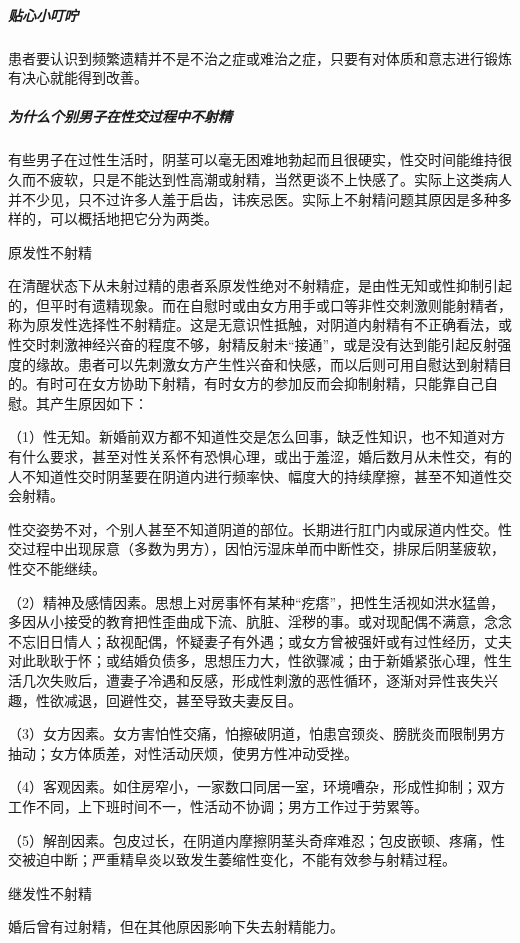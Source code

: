 \subparagraph{贴心小叮咛}

患者要认识到频繁遗精并不是不治之症或难治之症，只要有对体质和意志进行锻炼有决心就能得到改善。

\subparagraph{为什么个别男子在性交过程中不射精}

有些男子在过性生活时，阴茎可以毫无困难地勃起而且很硬实，性交时间能维持很久而不疲软，只是不能达到性高潮或射精，当然更谈不上快感了。实际上这类病人并不少见，只不过许多人羞于启齿，讳疾忌医。实际上不射精问题其原因是多种多样的，可以概括地把它分为两类。

原发性不射精

在清醒状态下从未射过精的患者系原发性绝对不射精症，是由性无知或性抑制引起的，但平时有遗精现象。而在自慰时或由女方用手或口等非性交刺激则能射精者，称为原发性选择性不射精症。这是无意识性抵触，对阴道内射精有不正确看法，或性交时刺激神经兴奋的程度不够，射精反射未“接通”，或是没有达到能引起反射强度的缘故。患者可以先刺激女方产生性兴奋和快感，而以后则可用自慰达到射精目的。有时可在女方协助下射精，有时女方的参加反而会抑制射精，只能靠自己自慰。其产生原因如下：

（1）性无知。新婚前双方都不知道性交是怎么回事，缺乏性知识，也不知道对方有什么要求，甚至对性关系怀有恐惧心理，或出于羞涩，婚后数月从未性交，有的人不知道性交时阴茎要在阴道内进行频率快、幅度大的持续摩擦，甚至不知道性交会射精。

性交姿势不对，个别人甚至不知道阴道的部位。长期进行肛门内或尿道内性交。性交过程中出现尿意（多数为男方），因怕污湿床单而中断性交，排尿后阴茎疲软，性交不能继续。

（2）精神及感情因素。思想上对房事怀有某种“疙瘩”，把性生活视如洪水猛兽，多因从小接受的教育把性歪曲成下流、肮脏、淫秽的事。或对现配偶不满意，念念不忘旧日情人；敌视配偶，怀疑妻子有外遇；或女方曾被强奸或有过性经历，丈夫对此耿耿于怀；或结婚负债多，思想压力大，性欲骤减；由于新婚紧张心理，性生活几次失败后，遭妻子冷遇和反感，形成性刺激的恶性循环，逐渐对异性丧失兴趣，性欲减退，回避性交，甚至导致夫妻反目。

（3）女方因素。女方害怕性交痛，怕擦破阴道，怕患宫颈炎、膀胱炎而限制男方抽动；女方体质差，对性活动厌烦，使男方性冲动受挫。

（4）客观因素。如住房窄小，一家数口同居一室，环境嘈杂，形成性抑制；双方工作不同，上下班时间不一，性活动不协调；男方工作过于劳累等。

（5）解剖因素。包皮过长，在阴道内摩擦阴茎头奇痒难忍；包皮嵌顿、疼痛，性交被迫中断；严重精阜炎以致发生萎缩性变化，不能有效参与射精过程。

继发性不射精

婚后曾有过射精，但在其他原因影响下失去射精能力。

